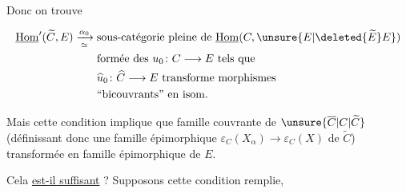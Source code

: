 Donc on trouve

\[
\begin{aligned}
\underline{\mathrm{Hom}}'(\widetilde C,E)\xrightarrow[\simeq]{\alpha_0}{}&
\text{sous-catégorie pleine de }\underline{\mathrm{Hom}}(C,\unsure{E|\deleted{\widetilde E}E})\\
&\text{formée des }u_0\colon C\longrightarrow E\text{ tels que}\\
&\widehat u_0\colon\widehat C\longrightarrow E\text{ transforme morphismes}\\
&\text{``bicouvrants'' en isom.}
\end{aligned}
\]

Mais cette condition implique que  famille couvrante  de $\unsure{\overline C|C|\widetilde C}$ (définissant donc une famille épimorphique $\varepsilon_C(X_\alpha)\longrightarrow\varepsilon_C(X)$ de $\widetilde C$)  transformée en famille épimorphique de $E$.

Cela \uline{est-il suffisant} ? Supposons cette condition remplie,


